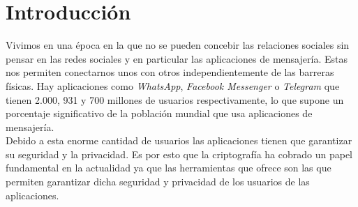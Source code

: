 \chapter{Introducción}
Vivimos en una época en la que no se pueden concebir las relaciones sociales sin pensar en las redes sociales y en particular las aplicaciones de mensajería. Estas nos permiten conectarnos unos con otros independientemente de las barreras físicas.
Hay aplicaciones como  \emph{WhatsApp}, \emph{Facebook Messenger} o \emph{Telegram} que tienen 2.000, 931 y 700 millones de usuarios respectivamente, lo que supone un porcentaje significativo de la población mundial que usa aplicaciones de mensajería.\\  
Debido a esta enorme cantidad de usuarios las aplicaciones tienen que garantizar su seguridad y la privacidad. Es por esto que la criptografía ha cobrado un papel fundamental en la actualidad ya que las herramientas que ofrece son las que permiten garantizar dicha seguridad y privacidad de los usuarios de las aplicaciones. 

